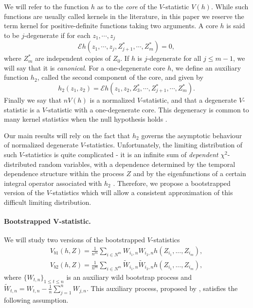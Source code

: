 \documentclass{article} %
\newcommand{\ev}{\mathcal{E}}
\begin{document}
We will refer to the function $h$ as to the \emph{core} of the $V$-statistic $V(h)$. While such functions are usually called kernels in the literature, in this paper we reserve the term kernel for positive-definite functions taking two arguments. A core $h$ is said to be $j$-degenerate if for each $z_1,\cdots,z_j$ 
\begin{equation}
\ev h(z_1,\cdots , z_j , Z_{j+1}^*,\cdots ,Z_m^*) = 0,
\end{equation}
where $Z_m^*$ are independent copies of $Z_0$. If $h$ is $j$-degenerate for all $j\leq m-1$, we will say that it is \emph{canonical}. For a one-degenerate core $h$, we define an auxiliary function $h_2$, called the second component of the core, and given by 
\begin{equation}
h_2(z_1,z_2) = \ev h(z_1,z_2, Z_3^*,\cdots, Z_{j+1}^*,\cdots ,Z_m^*).
\end{equation}
Finally we say that $nV(h)$ is a normalized $V$-statistic, and that a degenerate $V$-statistic is a $V$-statistic with a one-degenerate core.  This degeneracy is common to many kernel statistics when the null hypothesis holds \cite{gretton2012kernel,gretton_kernel_2008,sejdinovic2013kernel}.

 Our main results will rely on the fact that $h_2$ governs the asymptotic behaviour of normalized degenerate $V$-statistics. Unfortunately, the limiting distribution of such $V$-statistics is quite complicated - it is an infinite sum of \emph{dependent} $\chi^2$-distributed random variables, with a dependence  determined by the temporal dependence structure within the process $Z$ and by the eigenfunctions of a certain integral operator associated with $h_2$ \cite{i._s._borisov_orthogonal_2009,chwialkowski2014kernel}. Therefore, we propose a bootstrapped version of the $V$-statistics which will allow a consistent approximation of this difficult limiting distribution.  


\paragraph{Bootstrapped V-statistic.} 
We will study two versions of the bootstrapped $V$-statistics  
\begin{align}
 V_{b1}(h,Z) = \frac{1}{n^m} \sum_{i \in N^m} W_{i_1,n} W_{i_2,n} h(Z_{i_1},...,Z_{i_m}), \label{Vb1}\\ 
 V_{b2}(h,Z) = \frac{1}{n^m} \sum_{i \in N^m} \tilde W_{i_1,n}  \tilde W_{i_2,n} h(Z_{i_1},...,Z_{i_m}),\label{Vb2}
\end{align}
where $\{W_{t,n}\}_{1 \leq t \leq n }$ is an auxiliary wild bootstrap process and $\tilde W_{t,n} = W_{t,n} - \frac 1 n \sum_{j=1}^n W_{j,n}$. This auxiliary process, proposed by \cite{Shao2010,leucht_dependent_2013}, satisfies the following assumption.
\end{document}

